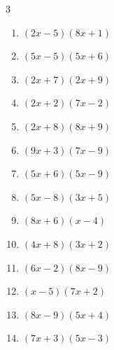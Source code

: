 \begin{multicols}{3}
\begin{enumerate}

  \item $(2x-5)(8x+1)$


  \item $(5x-5)(5x+6)$


  \item $(2x+7)(2x+9)$


  \item $(2x+2)(7x-2)$


  \item $(2x+8)(8x+9)$


  \item $(9x+3)(7x-9)$


  \item $(5x+6)(5x-9)$


  \item $(5x-8)(3x+5)$


  \item $(8x+6)(x-4)$


  \item $(4x+8)(3x+2)$


  \item $(6x-2)(8x-9)$


  \item $(x-5)(7x+2)$


\columnbreak %

  \item $(8x-9)(5x+4)$


  \item $(7x+3)(5x-3)$



\end{enumerate}
\end{multicols}
